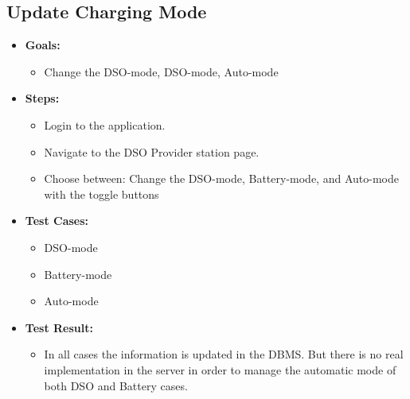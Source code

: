 \documentclass{Configuration_Files/PoliMi3i_thesis}
\begin{document}
\subsection{Update Charging Mode}
\begin{itemize}
    \item\textbf{Goals:}
        \begin{itemize}
            \item Change the DSO-mode, DSO-mode, Auto-mode 
       \end{itemize}
    \item \textbf{Steps:}
        \begin{itemize}
            \item Login to the application.
            \item Navigate to the DSO Provider station page. 
            \item Choose between: Change the DSO-mode, Battery-mode, and Auto-mode with the toggle buttons
        \end{itemize}
    \item \textbf{Test Cases:}
        \begin{itemize}
            \item DSO-mode
            \item Battery-mode
            \item Auto-mode
        \end{itemize}
    \item\textbf{Test Result:}
        \begin{itemize}
            \item In all cases the information is updated in the DBMS. But there is no real implementation in the server in order to manage the automatic mode of both DSO and Battery cases. 
    \end{itemize}
\end{itemize}
\end{document}
